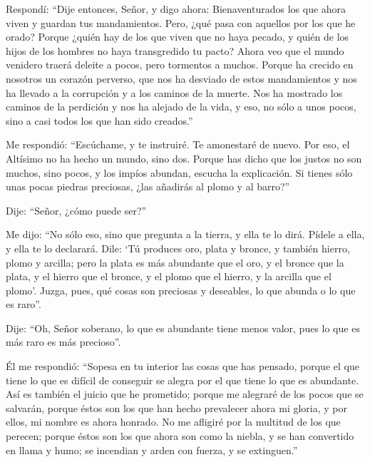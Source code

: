  Respondí: ``Dije entonces, Señor, y digo ahora:
Bienaventurados los que ahora viven y guardan tus mandamientos.
 Pero, ¿qué pasa con aquellos por los que he orado?
Porque ¿quién hay de los que viven que no haya pecado, y quién de los
hijos de los hombres no haya transgredido tu pacto? 
Ahora veo que el mundo venidero traerá deleite a pocos, pero tormentos a
muchos.  Porque ha crecido en nosotros un corazón
perverso, que nos ha desviado de estos mandamientos y nos ha llevado a
la corrupción y a los caminos de la muerte. Nos ha mostrado los caminos
de la perdición y nos ha alejado de la vida, y eso, no sólo a unos
pocos, sino a casi todos los que han sido creados.''

 Me respondió: ``Escúchame, y te instruiré. Te amonestaré
de nuevo.  Por eso, el Altísimo no ha hecho un mundo,
sino dos.  Porque has dicho que los justos no son muchos,
sino pocos, y los impíos abundan, escucha la explicación.
 Si tienes sólo unas pocas piedras preciosas, ¿las
añadirás al plomo y al barro?''

 Dije: ``Señor, ¿cómo puede ser?''

 Me dijo: ``No sólo eso, sino que pregunta a la tierra, y
ella te lo dirá. Pídele a ella, y ella te lo declarará. 
Dile: `Tú produces oro, plata y bronce, y también hierro, plomo y
arcilla;  pero la plata es más abundante que el oro, y el
bronce que la plata, y el hierro que el bronce, y el plomo que el
hierro, y la arcilla que el plomo'.  Juzga, pues, qué
cosas son preciosas y deseables, lo que abunda o lo que es raro''.

 Dije: ``Oh, Señor soberano, lo que es abundante tiene
menos valor, pues lo que es más raro es más precioso''.

 Él me respondió: ``Sopesa en tu interior las cosas que
has pensado, porque el que tiene lo que es difícil de conseguir se
alegra por el que tiene lo que es abundante.  Así es
también el juicio que he prometido; porque me alegraré de los pocos que
se salvarán, porque éstos son los que han hecho prevalecer ahora mi
gloria, y por ellos, mi nombre es ahora honrado.  No me
afligiré por la multitud de los que perecen; porque éstos son los que
ahora son como la niebla, y se han convertido en llama y humo; se
incendian y arden con fuerza, y se extinguen.''

